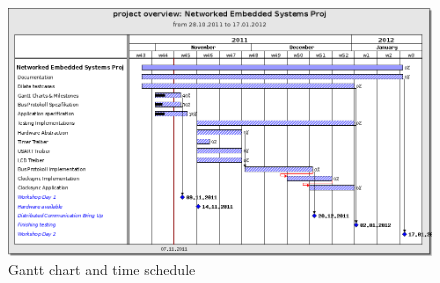 \begin{figure}[ht]
 \centering
 \includegraphics[angle=90,scale=0.6,keepaspectratio=true]{../images/201111_ganttchart.png}
 \caption{Gantt chart and time schedule}
 \label{fig:gantt chart}
\end{figure}
